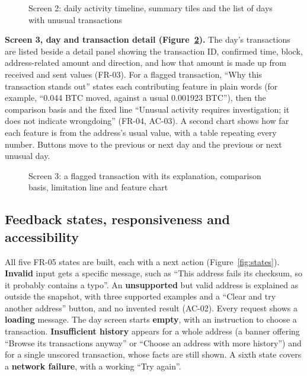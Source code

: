 \begin{figure}[htbp]
  \centering
  \caption{Screen 2: daily activity timeline, summary tiles and the list of days with unusual transactions}
  \label{fig:screen2}
\end{figure}

\textbf{Screen 3, day and transaction detail (Figure~\ref{fig:screen3}).} The day's transactions are listed beside a detail panel showing the transaction ID, confirmed time, block, address-related amount and direction, and how that amount is made up from received and sent values (FR-03). For a flagged transaction, “Why this transaction stands out” states each contributing feature in plain words (for example, “0.044 BTC moved, against a usual 0.001923 BTC”), then the comparison basis and the fixed line “Unusual activity requires investigation; it does not indicate wrongdoing” (FR-04, AC-03). A second chart shows how far each feature is from the address's usual value, with a table repeating every number. Buttons move to the previous or next day and the previous or next unusual day.

\begin{figure}[htbp]
  \centering
  \caption{Screen 3: a flagged transaction with its explanation, comparison basis, limitation line and feature chart}
  \label{fig:screen3}
\end{figure}

\subsection{Feedback states, responsiveness and accessibility}
\label{sec:states}

All five FR-05 states are built, each with a next action (Figure~\ref{fig:states}). \textbf{Invalid} input gets a specific message, such as “This address fails its checksum, so it probably contains a typo”. An \textbf{unsupported} but valid address is explained as outside the snapshot, with three supported examples and a “Clear and try another address” button, and no invented result (AC-02). Every request shows a \textbf{loading} message. The day screen starts \textbf{empty}, with an instruction to choose a transaction. \textbf{Insufficient history} appears for a whole address (a banner offering “Browse its transactions anyway” or “Choose an address with more history”) and for a single unscored transaction, whose facts are still shown. A sixth state covers a \textbf{network failure}, with a working “Try again”.

